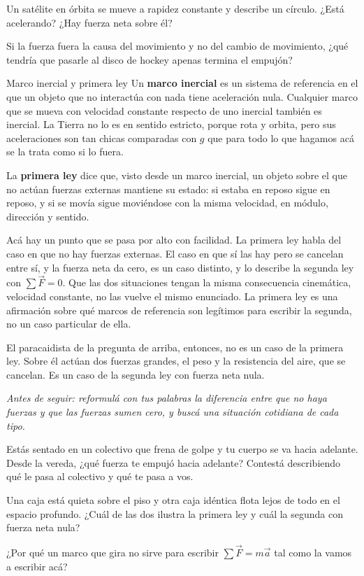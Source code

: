 \documentclass[11pt,openany]{book}
\begin{document}
\begin{chequeo}
\item Un satélite en órbita se mueve a rapidez constante y describe un círculo. ¿Está acelerando? ¿Hay fuerza neta sobre él?
\item Si la fuerza fuera la causa del movimiento y no del cambio de movimiento, ¿qué tendría que pasarle al disco de hockey apenas termina el empujón?
\end{chequeo}

\begin{bloque}{Marco inercial y primera ley}
Un \textbf{marco inercial} es un sistema de referencia en el que un objeto que no interactúa con nada tiene aceleración nula. Cualquier marco que se mueva con velocidad constante respecto de uno inercial también es inercial. La Tierra no lo es en sentido estricto, porque rota y orbita, pero sus aceleraciones son tan chicas comparadas con $g$ que para todo lo que hagamos acá se la trata como si lo fuera.

La \textbf{primera ley} dice que, visto desde un marco inercial, un objeto sobre el que no actúan fuerzas externas mantiene su estado: si estaba en reposo sigue en reposo, y si se movía sigue moviéndose con la misma velocidad, en módulo, dirección y sentido.

Acá hay un punto que se pasa por alto con facilidad. La primera ley habla del caso en que no hay fuerzas externas. El caso en que sí las hay pero se cancelan entre sí, y la fuerza neta da cero, es un caso distinto, y lo describe la segunda ley con $\sum \vec F = 0$. Que las dos situaciones tengan la misma consecuencia cinemática, velocidad constante, no las vuelve el mismo enunciado. La primera ley es una afirmación sobre qué marcos de referencia son legítimos para escribir la segunda, no un caso particular de ella.

El paracaidista de la pregunta de arriba, entonces, no es un caso de la primera ley. Sobre él actúan dos fuerzas grandes, el peso y la resistencia del aire, que se cancelan. Es un caso de la segunda ley con fuerza neta nula.

\textit{Antes de seguir: reformulá con tus palabras la diferencia entre que no haya fuerzas y que las fuerzas sumen cero, y buscá una situación cotidiana de cada tipo.}
\end{bloque}

\begin{chequeo}
\item Estás sentado en un colectivo que frena de golpe y tu cuerpo se va hacia adelante. Desde la vereda, ¿qué fuerza te empujó hacia adelante? Contestá describiendo qué le pasa al colectivo y qué te pasa a vos.
\item Una caja está quieta sobre el piso y otra caja idéntica flota lejos de todo en el espacio profundo. ¿Cuál de las dos ilustra la primera ley y cuál la segunda con fuerza neta nula?
\item ¿Por qué un marco que gira no sirve para escribir $\sum \vec F = m\vec a$ tal como la vamos a escribir acá?
\end{chequeo}
\end{document}
